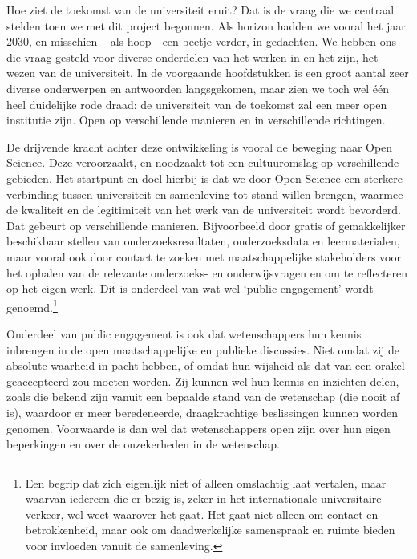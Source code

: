 \documentclass[empirical, authordate, ]{new-jote-article}
\begin{document}
	Hoe ziet de toekomst van de universiteit eruit? Dat is de vraag die we centraal stelden toen we met dit project begonnen. Als horizon hadden we vooral het jaar 2030, en misschien -- als hoop - een beetje verder, in gedachten. We hebben ons die vraag gesteld voor diverse onderdelen van het werken in en het zijn, het wezen van de universiteit. In de voorgaande hoofdstukken is een groot aantal zeer diverse onderwerpen en antwoorden langsgekomen, maar zien we toch wel één heel duidelijke rode draad: de universiteit van de toekomst zal een meer open institutie zijn. Open op verschillende manieren en in verschillende richtingen.



	De drijvende kracht achter deze ontwikkeling is vooral de beweging naar Open Science. Deze veroorzaakt, en noodzaakt tot een cultuuromslag op verschillende gebieden. Het startpunt en doel hierbij is dat we door Open Science een sterkere verbinding tussen universiteit en samenleving tot stand willen brengen, waarmee de kwaliteit en de legitimiteit van het werk van de universiteit wordt bevorderd. Dat gebeurt op verschillende manieren. Bijvoorbeeld door gratis of gemakkelijker beschikbaar stellen van onderzoeksresultaten, onderzoeksdata en leermaterialen, maar vooral ook door contact te zoeken met maatschappelijke stakeholders voor het ophalen van de relevante onderzoeks- en onderwijsvragen en om te reflecteren op het eigen werk. Dit is onderdeel van wat wel ‘public engagement' wordt genoemd.\footnote{Een begrip dat zich eigenlijk niet of alleen omslachtig laat vertalen, maar waarvan iedereen die er bezig is, zeker in het internationale universitaire verkeer, wel weet waarover het gaat. Het gaat niet alleen om contact en betrokkenheid, maar ook om daadwerkelijke samenspraak en ruimte bieden voor invloeden vanuit de samenleving.}



	Onderdeel van public engagement is ook dat wetenschappers hun kennis inbrengen in de open maatschappelijke en publieke discussies. Niet omdat zij de absolute waarheid in pacht hebben, of omdat hun wijsheid als dat van een orakel geaccepteerd zou moeten worden. Zij kunnen wel hun kennis en inzichten delen, zoals die bekend zijn vanuit een bepaalde stand van de wetenschap (die nooit af is), waardoor er meer beredeneerde, draagkrachtige beslissingen kunnen worden genomen. Voorwaarde is dan wel dat wetenschappers open zijn over hun eigen beperkingen en over de onzekerheden in de wetenschap.
\end{document}
